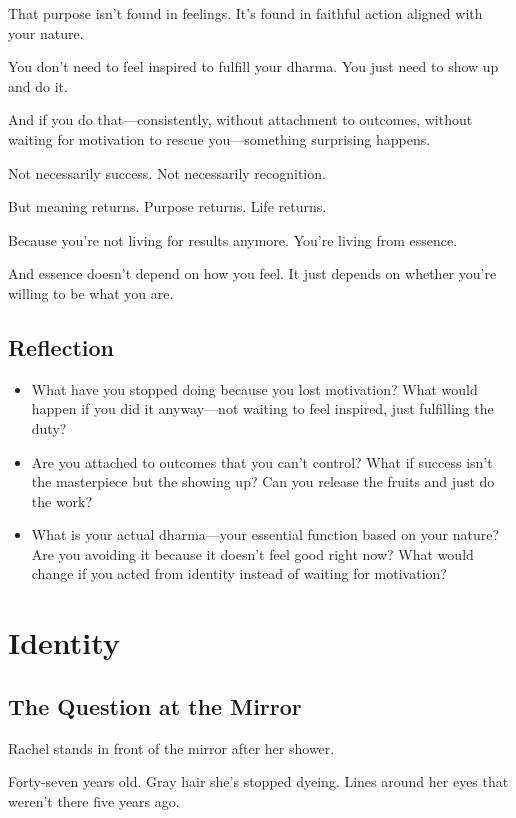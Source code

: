 \documentclass[11pt,twoside]{book}
\begin{document}
That purpose isn't found in feelings. It's found in faithful action aligned with your nature.

You don't need to feel inspired to fulfill your dharma. You just need to show up and do it.

And if you do that—consistently, without attachment to outcomes, without waiting for motivation to rescue you—something surprising happens.

Not necessarily success. Not necessarily recognition.

But meaning returns. Purpose returns. Life returns.

Because you're not living for results anymore. You're living from essence.

And essence doesn't depend on how you feel. It just depends on whether you're willing to be what you are.

\section*{Reflection}

\begin{itemize}
\item What have you stopped doing because you lost motivation? What would happen if you did it anyway—not waiting to feel inspired, just fulfilling the duty?
\item Are you attached to outcomes that you can't control? What if success isn't the masterpiece but the showing up? Can you release the fruits and just do the work?
\item What is your actual dharma—your essential function based on your nature? Are you avoiding it because it doesn't feel good right now? What would change if you acted from identity instead of waiting for motivation?
\end{itemize}

\chapter{Identity}

\section*{The Question at the Mirror}

Rachel stands in front of the mirror after her shower.

Forty-seven years old. Gray hair she's stopped dyeing. Lines around her eyes that weren't there five years ago.
\end{document}
